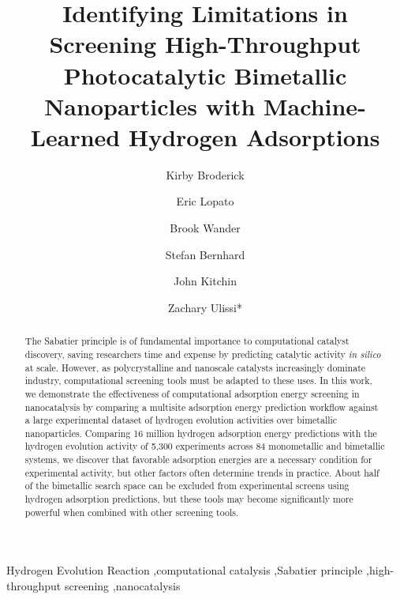 \documentclass[preprint,12pt]{elsarticle}
\begin{document}
\begin{frontmatter}

\title{Identifying Limitations in Screening High-Throughput Photocatalytic Bimetallic Nanoparticles with Machine-Learned Hydrogen Adsorptions}

\author[add1]{Kirby Broderick}
\author[add2]{Eric Lopato}
\author[add1]{Brook Wander}

\author[add2]{Stefan Bernhard}
\author[add1]{John Kitchin}
\author[add1]{Zachary Ulissi*}
\address[add1]{Carnegie Mellon University Department of Chemical Engineering, 5000 Forbes Avenue, Pittsburgh PA 15213, USA}
\address[add2]{Carnegie Mellon University Department of Chemistry, 4400 Fifth Avenue, Pittsburgh PA 15213, USA}

\raggedright
\begin{abstract}
  The Sabatier principle is of fundamental importance to computational catalyst discovery, saving researchers time and expense by predicting catalytic activity \emph{in silico} at scale. However, as polycrystalline and nanoscale catalysts increasingly dominate industry, computational screening tools must be adapted to these uses. In this work, we demonstrate the effectiveness of computational adsorption energy screening in nanocatalysis by comparing a multisite adsorption energy prediction workflow against a large experimental dataset of hydrogen evolution activities over bimetallic nanoparticles. Comparing 16 million hydrogen adsorption energy predictions with the hydrogen evolution activity of 5,300 experiments across 84 monometallic and bimetallic systems, we discover that favorable adsorption energies are a necessary condition for experimental activity, but other factors often determine trends in practice. About half of the bimetallic search space can be excluded from experimental screens using hydrogen adsorption predictions, but these tools may become significantly more powerful when combined with other screening tools.
\end{abstract}

\begin{keyword}
Hydrogen Evolution Reaction \sep computational catalysis \sep Sabatier principle \sep high-throughput screening \sep nanocatalysis
\end{keyword}

\end{frontmatter}

\end{document}
